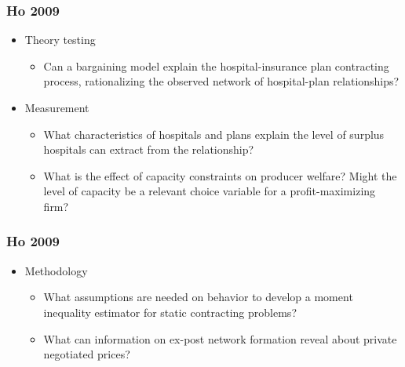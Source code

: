 \documentclass[aspectratio=169,11pt]{beamer}
\begin{document}

\begin{frame}
\frametitle{Ho 2009}

\begin{itemize}
	\item Theory testing
         \begin{itemize}
	\item Can a bargaining model explain the hospital-insurance plan contracting process, rationalizing the observed network of hospital-plan relationships? 	\end{itemize}
	\item Measurement
	\begin{itemize}
	\item What characteristics of hospitals and plans explain the level of surplus hospitals can extract from the relationship?
	\item What is the effect of capacity constraints on producer welfare?  Might the level of capacity be a relevant choice variable for a profit-maximizing firm?
	\end{itemize}
\end{itemize}
\end{frame}


\begin{frame}
\frametitle{Ho 2009}

\begin{itemize}
	\item Methodology
	\begin{itemize}
	\item What assumptions are needed on behavior to develop a moment inequality estimator for static contracting problems?
	\item What can information on ex-post network formation reveal about private negotiated prices?
	\end{itemize}
\end{itemize}
\end{frame}

\end{document}
